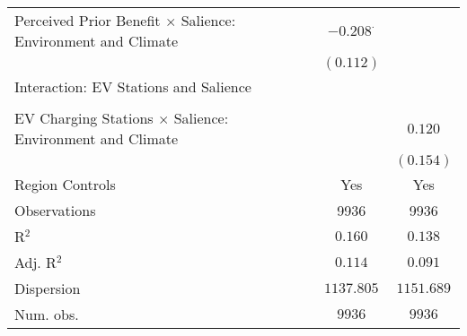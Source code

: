 \begin{center}
\begin{tiny}
\begin{longtable}{l@{} c@{} c@{}}
\quad Perceived Prior Benefit $\times$ Salience: Environment and Climate & $-0.208^{\cdot}$ &                \\
                                                                         & $(0.112)$        &                \\
Interaction: EV Stations and Salience                                    &                  &                \\
                                                                         &                  &                \\
\quad EV Charging Stations $\times$ Salience: Environment and Climate    &                  & $0.120$        \\
                                                                         &                  & $(0.154)$      \\
\hline
Region Controls                                                          & Yes              & Yes            \\
Observations                                                             & 9936             & 9936           \\
R$^2$                                                                    & $0.160$          & $0.138$        \\
Adj. R$^2$                                                               & $0.114$          & $0.091$        \\
Dispersion                                                               & $1137.805$       & $1151.689$     \\
Num. obs.                                                                & $9936$           & $9936$         \\
\end{longtable}
\end{tiny}
\end{center}

